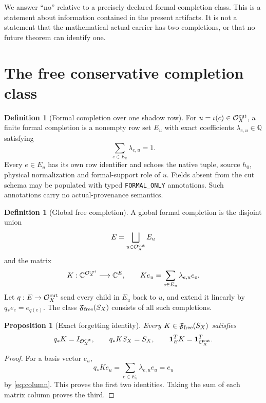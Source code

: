 \documentclass[11pt]{article}
\newtheorem{proposition}[theorem]{Proposition}
\theoremstyle{definition}
\newtheorem{definition}[theorem]{Definition}
\theoremstyle{remark}
\newcommand{\Ocut}{\mathcal O_X^{\rm cut}}
\newcommand{\one}{\mathbf 1}
\begin{document}
We answer ``no'' relative to a precisely declared formal completion
class.  This is a statement about information contained in the
present artifacts.  It is not a statement that the mathematical
actual carrier has two completions, or that no future theorem can
identify one.

\section{The free conservative completion class}

\begin{definition}[Formal completion over one shadow row]
For \(u=\iota(c)\in\Ocut\), a finite formal completion is a nonempty
row set \(E_u\) with exact coefficients
\(\lambda_{e,u}\in\mathbb Q\) satisfying
\begin{equation}
 \sum_{e\in E_u}\lambda_{e,u}=1.
 \label{eq:column}
\end{equation}
Every \(e\in E_u\) has its own row identifier and echoes the native
tuple, source \(h_0\), physical normalization and formal-support role
of \(u\).  Fields absent from the cut schema may be populated with
typed \texttt{FORMAL\_ONLY} annotations.  Such annotations carry no
actual-provenance semantics.
\end{definition}

\begin{definition}[Global free completion]
A global formal completion is the disjoint union
\[
 E=\bigsqcup_{u\in\Ocut}E_u
\]
and the matrix
\[
 K:\mathbb C^{\Ocut}\longrightarrow\mathbb C^E,
 \qquad
 Ke_u=\sum_{e\in E_u}\lambda_{e,u}e_e.
\]
Let \(q:E\to\Ocut\) send every child in \(E_u\) back to \(u\), and
extend it linearly by \(q_*e_e=e_{q(e)}\).  The class
\(\mathfrak F_{\rm free}(S_X)\) consists of all such completions.
\end{definition}

\begin{proposition}[Exact forgetting identity]
\label{prop:forget}
Every \(K\in\mathfrak F_{\rm free}(S_X)\) satisfies
\[
 q_*K=I_{\Ocut},\qquad
 q_*KS_X=S_X,\qquad
 \one_E^TK=\one_{\Ocut}^T.
\]
\end{proposition}

\begin{proof}
For a basis vector \(e_u\),
\[
 q_*Ke_u
 =\sum_{e\in E_u}\lambda_{e,u}e_u=e_u
\]
by \eqref{eq:column}.  This proves the first two identities.  Taking
the sum of each matrix column proves the third.
\end{proof}
\end{document}
